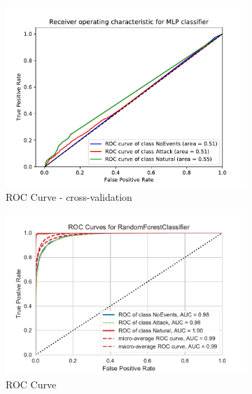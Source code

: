 \begin{figure}[H]
    \begin{subfigure}[t]{0.33\textwidth}
        \centering
        \includegraphics[page=1, width=\linewidth]{images/results_scikit/MLP}
        \caption{ROC Curve - cross-validation}
        \label{fig:scikit_MLP_ROC}
    \end{subfigure}
    \begin{subfigure}[t]{0.33\textwidth}
        \centering
        \includegraphics[page=3, width=\linewidth]{images/roc_3c}
        \caption{ROC Curve}
        \label{fig:scikit_RF_ROC}
    \end{subfigure}
    \begin{subfigure}[t]{0.3\textwidth}
        \centering

\end{subfigure}
\end{figure}
